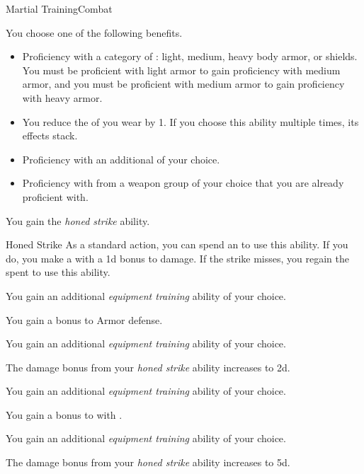     \begin{feat}{Martial Training}{Combat}

         You choose one of the following benefits.
        \begin{itemize}
            \item Proficiency with a category of : light, medium, heavy body armor, or shields.
                You must be proficient with light armor to gain proficiency with medium armor, and you must be proficient with medium armor to gain proficiency with heavy armor.
            \item You reduce the  of  you wear by 1.
                If you choose this ability multiple times, its effects stack.
            \item Proficiency with an additional  of your choice.
            \item Proficiency with  from a weapon group of your choice that you are already proficient with.
        \end{itemize}

         You gain the \textit{honed strike} ability.
        \begin{ability}{Honed Strike}
            As a standard action, you can spend an  to use this ability.
            If you do, you make a  with a \plus1d bonus to damage.
            If the strike misses, you regain the  spent to use this ability.
        \end{ability}

         You gain an additional \textit{equipment training} ability of your choice.

         You gain a  bonus to Armor defense.

         You gain an additional \textit{equipment training} ability of your choice.

         The damage bonus from your \textit{honed strike} ability increases to \plus2d.

         You gain an additional \textit{equipment training} ability of your choice.

         You gain a  bonus to  with .

         You gain an additional \textit{equipment training} ability of your choice.

         The damage bonus from your \textit{honed strike} ability increases to \plus5d.
    \end{feat}

